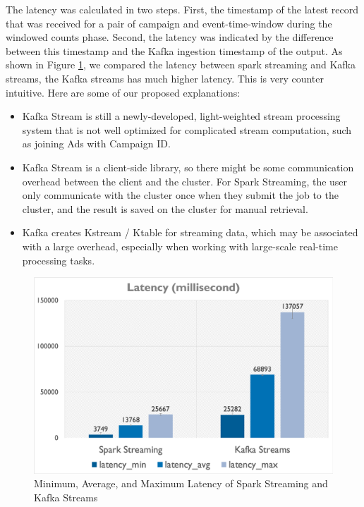 \documentclass[pdftex,twocolumn,10pt,letterpaper]{article}
\begin{document}
The latency was calculated in two steps. First, the timestamp of the latest record that was received for a pair of campaign and event-time-window during the windowed counts phase. Second, the latency was indicated by the difference between this timestamp and the Kafka ingestion timestamp of the output. As shown in Figure \ref{fig:latency}, we compared the latency between spark streaming and Kafka streams, the Kafka streams has much higher latency. This is very counter intuitive. Here are some of our proposed explanations: 
\begin{itemize}
    \item Kafka Stream is still a newly-developed, light-weighted stream processing system that is not well optimized for complicated stream computation, such as joining Ads with Campaign ID. 
    \item Kafka Stream is a client-side library, so there might be some communication overhead between the client and the cluster. For Spark Streaming, the user only communicate with the cluster once when they submit the job to the cluster, and the result is saved on the cluster for manual retrieval.  
    \item Kafka creates Kstream / Ktable for streaming data, which may be associated with a large overhead, especially when working with large-scale real-time processing tasks. 
\end{itemize}

\begin{figure}
    \centering
    \includegraphics[width=\linewidth]{latency.png}
    \caption{Minimum, Average, and Maximum Latency of Spark Streaming and Kafka Streams}
    \label{fig:latency}
\end{figure}
\end{document}
